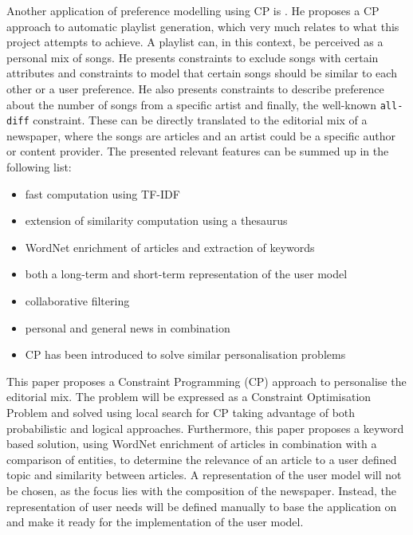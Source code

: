 Another application of preference modelling using CP is \cite{LSVossen}. He proposes a CP approach to automatic playlist generation, which very much relates to what this project attempts to achieve. A playlist can, in this context, be perceived as a personal mix of songs. He presents constraints to exclude songs with certain attributes and constraints to model that certain songs should be similar to each other or a user preference. He also presents constraints to describe preference about the number of songs from a specific artist and finally, the well-known \texttt{all-diff} constraint. These can be directly translated to the editorial mix of a newspaper, where the songs are articles and an artist could be a specific author or content provider.
\clearpage
The presented relevant features can be summed up in the following list:
\begin{itemize}\itemdist
	\item fast computation using TF-IDF
	\item extension of similarity computation using a thesaurus
	\item WordNet enrichment of articles and extraction of keywords
	\item both a long-term and short-term representation of the user model
	\item collaborative filtering
	\item personal and general news in combination
	\item CP has been introduced to solve similar personalisation problems
\end{itemize}

This paper proposes a Constraint Programming (CP) approach to personalise the editorial mix. The problem will be expressed as a Constraint Optimisation Problem and solved using local search for CP taking advantage of both probabilistic and logical approaches. Furthermore, this paper proposes a keyword based solution, using WordNet enrichment of articles in combination with a comparison of entities, to determine the relevance of an article to a user defined topic and similarity between articles. A representation of the user model will not be chosen, as the focus lies with the composition of the newspaper. Instead, the representation of user needs will be defined manually to base the application on and make it ready for the implementation of the user model.


